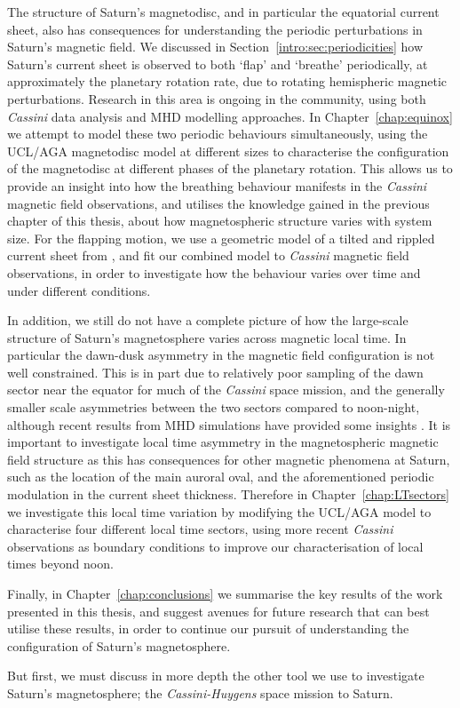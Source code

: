 The structure of Saturn's magnetodisc, and in particular the equatorial current sheet, also has consequences for understanding the periodic perturbations in Saturn's magnetic field. We discussed in Section~\ref{intro:sec:periodicities} how Saturn's current sheet is observed to both `flap' and `breathe' periodically, at approximately the planetary rotation rate, due to rotating hemispheric magnetic perturbations. Research in this area is ongoing in the community, using both \textit{Cassini} data analysis and MHD modelling approaches. In Chapter~\ref{chap:equinox} we attempt to model these two periodic behaviours simultaneously, using the UCL/AGA magnetodisc model at different sizes to characterise the configuration of the magnetodisc at different phases of the planetary rotation. This allows us to provide an insight into how the breathing behaviour manifests in the \textit{Cassini} magnetic field observations, and utilises the knowledge gained in the previous chapter of this thesis, about how magnetospheric structure varies with system size. For the flapping motion, we use a geometric model of a tilted and rippled current sheet from \citet{arridge2011}, and fit our combined model to \textit{Cassini} magnetic field observations, in order to investigate how the behaviour varies over time and under different conditions.

In addition, we still do not have a complete picture of how the large-scale structure of Saturn's magnetosphere varies across magnetic local time. In particular the dawn-dusk asymmetry in the magnetic field configuration is not well constrained. This is in part due to relatively poor sampling of the dawn sector near the equator for much of the \textit{Cassini} space mission, and the generally smaller scale asymmetries between the two sectors compared to noon-night, although recent results from MHD simulations have provided some insights \citep[e.g.][]{jia2016}. It is important to investigate local time asymmetry in the magnetospheric magnetic field structure as this has consequences for other magnetic phenomena at Saturn, such as the location of the main auroral oval, and the aforementioned periodic modulation in the current sheet thickness. Therefore in Chapter~\ref{chap:LTsectors} we investigate this local time variation by modifying the UCL/AGA model to characterise four different local time sectors, using more recent \textit{Cassini} observations as boundary conditions to improve our characterisation of local times beyond noon.

Finally, in Chapter~\ref{chap:conclusions} we summarise the key results of the work presented in this thesis, and suggest avenues for future research that can best utilise these results, in order to continue our pursuit of understanding the configuration of Saturn's magnetosphere.

But first, we must discuss in more depth the other tool we use to investigate Saturn's magnetosphere; the \textit{Cassini-Huygens} space mission to Saturn.
